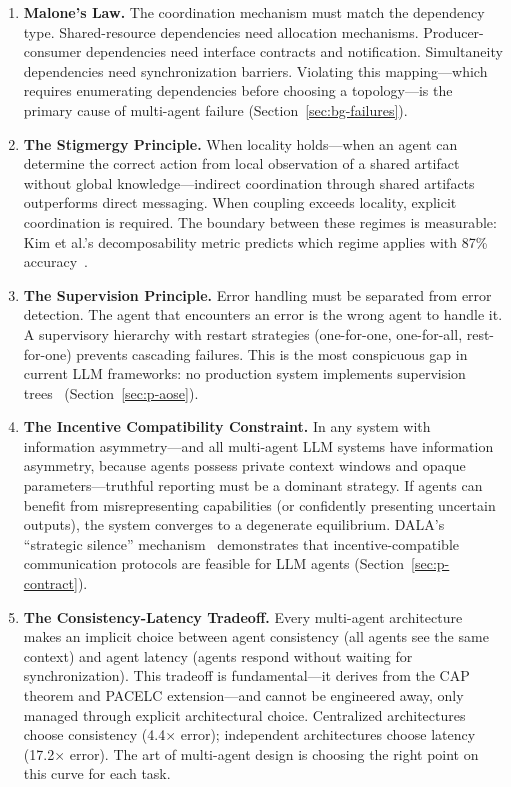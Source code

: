 \documentclass{article}
\begin{document}
\begin{enumerate}[label=\textbf{Law \arabic*}:, leftmargin=2cm]

  \item \textbf{Malone's Law.}
  The coordination mechanism must match the dependency type. Shared-resource dependencies
  need allocation mechanisms. Producer-consumer dependencies need interface contracts and
  notification. Simultaneity dependencies need synchronization barriers. Violating this
  mapping---which requires enumerating dependencies before choosing a
  topology---is the primary cause of multi-agent failure
  (Section~\ref{sec:bg-failures}).

  \item \textbf{The Stigmergy Principle.}
  When locality holds---when an agent can determine the correct action from local
  observation of a shared artifact without global knowledge---indirect coordination
  through shared artifacts outperforms direct messaging. When coupling exceeds locality,
  explicit coordination is required. The boundary between these regimes is measurable:
  Kim et al.'s decomposability metric predicts which regime applies with 87\%
  accuracy~\citep{kim2025scaling}.

  \item \textbf{The Supervision Principle.}
  Error handling must be separated from error detection. The agent that encounters an
  error is the wrong agent to handle it. A supervisory hierarchy with restart strategies
  (one-for-one, one-for-all, rest-for-one) prevents cascading failures. This is the
  most conspicuous gap in current LLM frameworks: no production system implements
  supervision trees~\citep{armstrong2003erlang} (Section~\ref{sec:p-aose}).

  \item \textbf{The Incentive Compatibility Constraint.}
  In any system with information asymmetry---and all multi-agent LLM systems have
  information asymmetry, because agents possess private context windows and opaque
  parameters---truthful reporting must be a dominant strategy. If agents can benefit from
  misrepresenting capabilities (or confidently presenting uncertain outputs), the system
  converges to a degenerate equilibrium. DALA's ``strategic silence''
  mechanism~\citep{dala2025} demonstrates that incentive-compatible communication
  protocols are feasible for LLM agents (Section~\ref{sec:p-contract}).

  \item \textbf{The Consistency-Latency Tradeoff.}
  Every multi-agent architecture makes an implicit choice between agent consistency (all
  agents see the same context) and agent latency (agents respond without waiting for
  synchronization). This tradeoff is fundamental---it derives from the CAP theorem and
  PACELC extension---and cannot be engineered away, only managed through explicit
  architectural choice. Centralized architectures choose consistency (4.4$\times$ error);
  independent architectures choose latency (17.2$\times$ error). The art of multi-agent
  design is choosing the right point on this curve for each task.

\end{enumerate}
\end{document}
